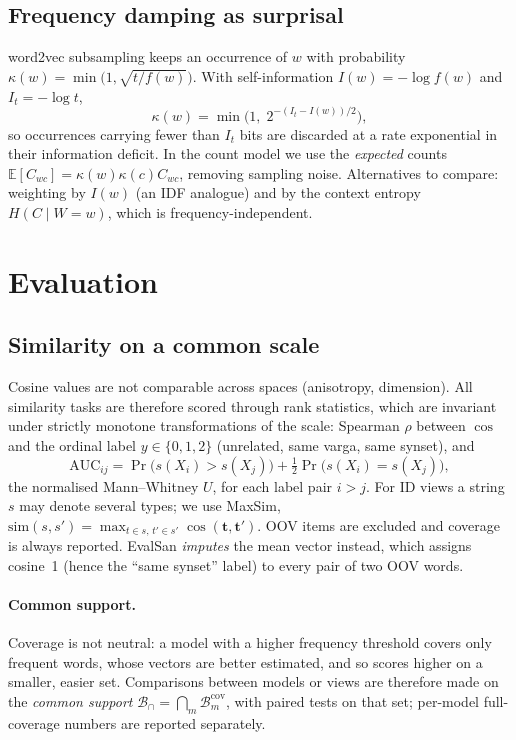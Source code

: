 \documentclass[11pt,a4paper]{article}
\theoremstyle{remark}\newtheorem{remark}{Remark}
\newcommand{\B}{\mathcal{B}}            %
\newcommand{\E}{\mathbb{E}}
\renewcommand{\v}[1]{\bm{#1}}           %
\begin{document}
\subsection{Frequency damping as surprisal}
word2vec subsampling keeps an occurrence of $w$ with probability
$\kappa(w)=\min\bigl(1,\sqrt{t/f(w)}\bigr)$. With self-information
$I(w)=-\log f(w)$ and $I_t=-\log t$,
\[
\kappa(w)=\min\bigl(1,\;2^{-(I_t-I(w))/2}\bigr),
\]
so occurrences carrying fewer than $I_t$ bits are discarded at a rate
exponential in their information deficit. In the count model we use the
\emph{expected} counts $\E[C_{wc}]=\kappa(w)\kappa(c)C_{wc}$, removing sampling
noise. Alternatives to compare: weighting by $I(w)$ (an IDF analogue) and by
the context entropy $H(C\mid W=w)$, which is frequency-independent.

\section{Evaluation}
\subsection{Similarity on a common scale}
Cosine values are not comparable across spaces (anisotropy, dimension).
All similarity tasks are therefore scored through rank statistics, which
are invariant under strictly monotone transformations of the scale:
Spearman $\rho$ between $\cos$ and the ordinal label
$y\in\{0,1,2\}$ (unrelated, same varga, same synset), and
\[
\mathrm{AUC}_{ij}=\Pr\bigl(s(X_i)>s(X_j)\bigr)+\tfrac12\Pr\bigl(s(X_i)=s(X_j)\bigr),
\]
the normalised Mann--Whitney $U$, for each label pair $i>j$. For ID views a
string $s$ may denote several types; we use MaxSim,
$\mathrm{sim}(s,s')=\max_{t\in s,\,t'\in s'}\cos(\v{t},\v{t}')$.
OOV items are excluded and coverage is always reported. EvalSan
\emph{imputes} the mean vector instead, which assigns cosine~1 (hence the
``same synset'' label) to every pair of two OOV words.

\paragraph{Common support.} Coverage is not neutral: a model with a higher
frequency threshold covers only frequent words, whose vectors are better
estimated, and so scores higher on a smaller, easier set. Comparisons between
models or views are therefore made on the \emph{common support}
$\B_\cap=\bigcap_m \B^{\mathrm{cov}}_m$, with paired tests on that set;
per-model full-coverage numbers are reported separately.
\end{document}

